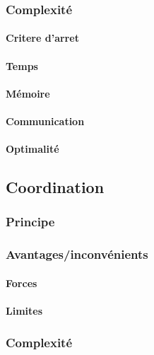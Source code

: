 \documentclass[a4paper, 10pt]{article}
\begin{document}
\subsubsection{Complexité}

\paragraph{Critere d'arret}

\paragraph{Temps}

\paragraph{Mémoire}

\paragraph{Communication}

\paragraph{Optimalité}

\subsection{Coordination}

\subsubsection{Principe}

\subsubsection{Avantages/inconvénients}

\paragraph{Forces}

\paragraph{Limites}

\subsubsection{Complexité}
\end{document}
